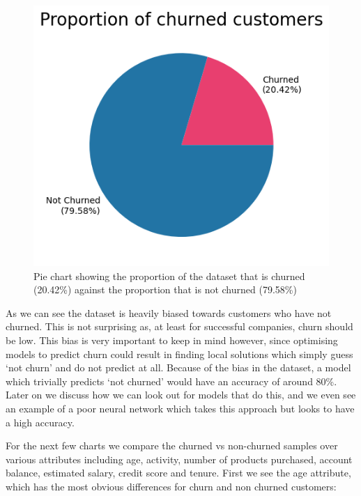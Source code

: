 \documentclass[]{article}
\begin{document}
\begin{figure}[h!]
	\centering
	\includegraphics[scale=0.5]{churn_proportion}
	\caption{Pie chart showing the proportion of the dataset that is churned (20.42\%) against the proportion that is not churned (79.58\%)}
\end{figure}

As we can see the dataset is heavily biased towards customers who have not churned. This is not surprising as, at least for successful companies, churn should be low. This bias is very important to keep in mind however, since optimising models to predict churn could result in finding local solutions which simply guess ‘not churn’ and do not predict at all. Because of the bias in the dataset, a model which trivially predicts ‘not churned’ would have an accuracy of around 80\%. Later on we discuss how we can look out for models that do this, and we even see an example of a poor neural network which takes this approach but looks to have a high accuracy.

For the next few charts we compare the churned vs non-churned samples over various attributes including age, activity, number of products purchased, account balance, estimated salary, credit score and tenure. First we see the age attribute, which has the most obvious differences for churn and non churned customers:
\end{document}
